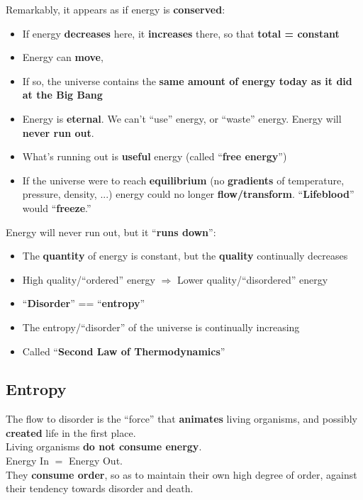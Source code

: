 \documentclass[12pt]{article}
\theoremstyle{definition}
\begin{document}
Remarkably, it appears as if energy is \textbf{conserved}:
\begin{itemize}
  \item If energy \textbf{decreases} here, it \textbf{increases} there, so that \textbf{total = constant}
  \item Energy can \textbf{move},
  \item If so, the universe contains the \textbf{same amount of energy today as it did at the Big Bang}
  \item Energy is \textbf{eternal}.
  We can't ``use'' energy, or ``waste'' energy.
  Energy will \textbf{never run out}.
  \item What's running out is \textbf{useful} energy (called ``\textbf{free energy}'')
  \item If the universe were to reach \textbf{equilibrium} (no \textbf{gradients} of temperature, pressure, density, ...) energy could no longer \textbf{flow/transform}.
  ``\textbf{Lifeblood}'' would ``\textbf{freeze}.''
\end{itemize}

Energy will never run out, but it ``\textbf{runs down}'':
\begin{itemize}
  \item The \textbf{quantity} of energy is constant, but the \textbf{quality} continually decreases
  \item High quality/``ordered'' energy $\Rightarrow$ Lower quality/``disordered'' energy
  \item ``\textbf{Disorder}'' == ``\textbf{entropy}''
  \item The entropy/``disorder'' of the universe is continually increasing
  \item Called ``\textbf{Second Law of Thermodynamics}''
\end{itemize}

\subsection{Entropy}
The flow to disorder is the ``force'' that \textbf{animates} living organisms, and possibly \textbf{created} life in the first place. \\

Living organisms \textbf{do not consume energy}. \\
Energy In $=$ Energy Out. \\

They \textbf{consume order}, so as to maintain their own high degree of order, against their tendency towards disorder and death. \\
\end{document}
